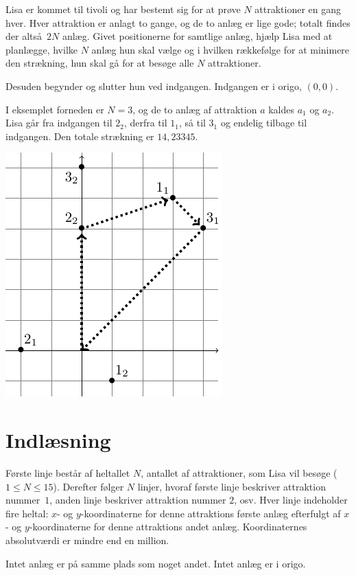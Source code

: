 
Lisa er kommet til tivoli og har bestemt sig for at prøve $N$ attraktioner en gang hver.
Hver attraktion er anlagt to gange, og de to anlæg er lige gode; totalt findes der altså $2N$ anlæg.
Givet positionerne for samtlige anlæg, hjælp Lisa med at planlægge, hvilke $N$ anlæg hun skal vælge og i hvilken rækkefølge for at minimere den strækning, hun skal gå for at besøge alle $N$ attraktioner.

Desuden begynder og slutter hun ved indgangen.
Indgangen er i origo, $(0,0)$.

I eksemplet forneden er $N=3$, og de to anlæg af attraktion $a$ kaldes $a_1$ og $a_2$.
Lisa går fra indgangen til $2_2$, derfra til $1_1$, så til $3_1$ og endelig tilbage til indgangen.
Den totale strækning er $14{,}23345$.

\bigskip
\includegraphics{img/tivoli-sample-img.pdf}

\section*{Indlæsning}
Første linje består af heltallet $N$, antallet af attraktioner, som Lisa vil besøge ($1 \le N \le 15$).
Derefter følger $N$ linjer, hvoraf første linje beskriver attraktion nummer~$1$, anden linje beskriver attraktion nummer $2$, osv.
Hver linje indeholder fire heltal: $x$- og $y$-koordinaterne for denne attraktions første anlæg efterfulgt af $x$- og $y$-koordinaterne for denne attraktions andet anlæg.
Koordinaternes absolutværdi er mindre end en million.

Intet anlæg er på samme plads som noget andet.
Intet anlæg er i origo.

